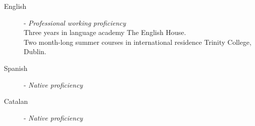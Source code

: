 \begin{description}

    \item[English] - \emph{Professional working proficiency} \hfill \\
        Three years in language academy The English House. \\
        Two month-long summer courses in international residence Trinity College, Dublin.
    
    \item[Spanish] - \emph{Native proficiency}
    
    \item[Catalan] - \emph{Native proficiency}

\end{description}